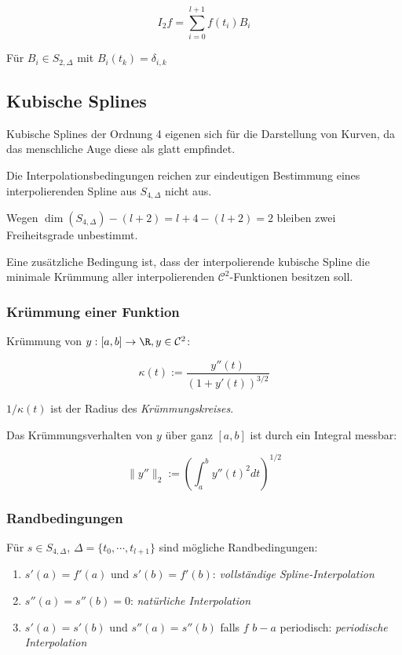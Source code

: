 $$I_2 f = \sum_{i=0}^{l+1} f(t_i) B_i$$

Für $B_i \in S_{2,\Delta}$ mit $B_i(t_k) = \delta_{i,k}$

\subsection*{Kubische Splines}

Kubische Splines der Ordnung 4 eigenen sich für die Darstellung von Kurven, da das menschliche Auge diese als glatt empfindet.

\spacing

Die Interpolationsbedingungen reichen zur eindeutigen Bestimmung eines interpolierenden Spline aus $S_{4,\Delta}$ nicht aus.

Wegen $\dim(S_{4,\Delta}) - (l+2) = l+4-(l+2) = 2$ bleiben zwei Freiheitsgrade unbestimmt.

Eine zusätzliche Bedingung ist, dass der interpolierende kubische Spline die minimale Krümmung aller interpolierenden $\mathcal{C}^2$-Funktionen besitzen soll.

\subsubsection*{Krümmung einer Funktion}

Krümmung von $y : [a,b] \rightarrow \R, y \in \mathcal{C}^2$:

$$\kappa(t) := \frac{y''(t)}{(1+y'(t))^{3/2}}$$

$1/\kappa(t)$ ist der Radius des \emph{Krümmungskreises}.

Das Krümmungsverhalten von $y$ über ganz $[a,b]$ ist durch ein Integral messbar:

$$\|y''\|_2 := \left(\int_a^b y''(t)^2 dt\right)^{1/2}$$

\subsubsection*{Randbedingungen}

Für $s \in S_{4,\Delta}$, $\Delta = \{t_0,\cdots,t_{l+1}\}$ sind mögliche Randbedingungen:

\begin{enumerate}[label=(\alph*)]
	\item $s'(a) = f'(a)$ und $s'(b)=f'(b)$: \emph{vollständige Spline-Interpolation}
	\item $s''(a) = s''(b) = 0$: \emph{natürliche Interpolation}
	\item $s'(a) = s'(b)$ und $s''(a) = s''(b)$ falls $f$ $b-a$ periodisch: \emph{periodische Interpolation}
\end{enumerate}

